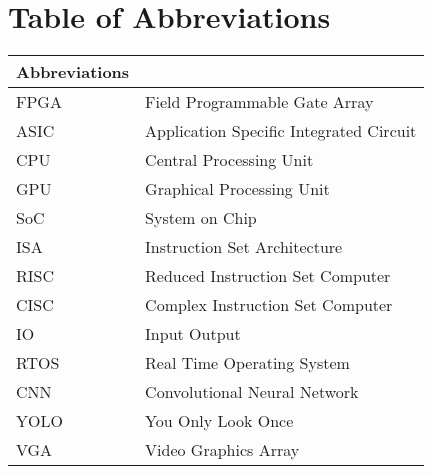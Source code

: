 


\clearpage
\pagestyle{headings}

\chapter[Table of Abbreviations ]{Table of Abbreviations}


\begin{center}
	\small
	\begin{longtable}{ll}
	\toprule
	Abbreviations & {} \\
	\bottomrule
	FPGA			& Field Programmable Gate Array \\
	ASIC			& Application Specific Integrated Circuit \\
	CPU				& Central Processing Unit \\
	GPU				& Graphical Processing Unit \\
	SoC				& System on Chip \\
	ISA				& Instruction Set Architecture \\
    RISC            & Reduced Instruction Set Computer \\
	CISC            & Complex Instruction Set Computer \\
	IO				& Input Output \\
	RTOS			& Real Time Operating System \\
	CNN			    & Convolutional Neural Network \\
    YOLO            & You Only Look Once \\
	VGA				& Video Graphics Array \\
	\hline 
	\end{longtable}
\end{center}

\clearpage

\tableofcontents
	\clearpage
\listoffigures
\listoftables


